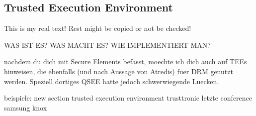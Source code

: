 \subsection{Trusted Execution Environment}\label{subsection:counter-external-tee}
This is my real text! Rest might be copied or not be checked!

WAS IST ES?
WAS MACHT ES?
WIE IMPLEMENTIERT MAN?


nachdem du dich mit Secure Elements befasst, moechte ich dich auch auf TEEs hinweisen, die ebenfalls (und nach Aussage von Atredis) fuer DRM genutzt werden. Speziell dortiges QSEE hatte jedoch schwerwiegende Luecken.


beispiele:
new section trusted execution environment
trusttronic letzte conference
samsung knox
